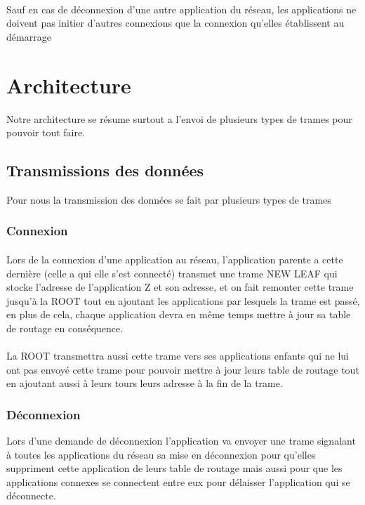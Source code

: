 \documentclass[a4paper,titlepage]{report}
\begin{document}
\paragraph{}
Sauf en cas de déconnexion d'une autre application du réseau, les applications ne doivent pas initier d'autres connexions que la connexion qu'elles établissent au démarrage
\pagebreak







\section{Architecture}
Notre architecture se résume surtout a l'envoi de plusieurs types de trames pour pouvoir tout faire.
\subsection{Transmissions des données}
Pour nous la transmission des données se fait par plusieurs types de trames 
\subsubsection{Connexion}
\paragraph{}
Lors de la connexion d'une application au réseau, l'application parente a cette dernière (celle a qui elle s'est connecté) transmet une trame NEW LEAF qui stocke l'adresse de l'application Z et son adresse, et on fait remonter cette trame jusqu'à la ROOT tout en ajoutant les applications par lesquels la trame est passé, en plus de cela, chaque application devra en même temps mettre à jour sa table de routage en conséquence. 
\paragraph{}
La ROOT transmettra aussi cette trame vers ses applications enfants qui ne lui ont pas envoyé cette trame pour pouvoir mettre à jour leurs table de routage tout en ajoutant aussi à leurs tours leurs adresse à la fin de la trame.

\subsubsection{Déconnexion}
Lors d'une demande de déconnexion l'application va envoyer une trame signalant à toutes les applications du réseau sa mise en déconnexion pour qu'elles suppriment cette application de leurs table de routage mais aussi pour que les applications connexes se connectent entre eux pour délaisser l'application qui se déconnecte. 
\end{document}
